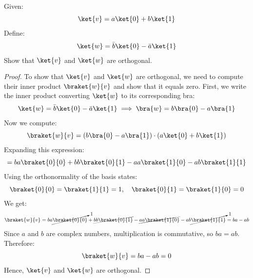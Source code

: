 \begin{examplebox}
    Given:
    \begin{equation*}
        \ket{v} = a \ket{0} + b \ket{1}
    \end{equation*}
    Define:
    \begin{equation*}
        \ket{w} = \bar{b} \ket{0} - \bar{a} \ket{1}
    \end{equation*}
    Show that $\ket{v}$ and $\ket{w}$ are orthogonal.

    \begin{proof}
        To show that $\ket{v}$ and $\ket{w}$ are orthogonal, we need to compute their inner product $\braket{w}{v}$ and show that it equals zero. First, we write the inner product converting $\ket{w}$ to its corresponding bra:
        \begin{equation*}
            \ket{w} = \bar{b} \ket{0} - \bar{a} \ket{1} \implies \bra{w} = b \bra{0} - a \bra{1}
        \end{equation*}
        Now we compute:
        \begin{equation*}
            \braket{w}{v}
            =
            \left(b \bra{0} - a \bra{1}\right) \cdot \left(a \ket{0} + b \ket{1}\right)
        \end{equation*}
        Expanding this expression:
        \begin{equation*}
            = b a \braket{0}{0}
            + b b \braket{0}{1}
            - a a \braket{1}{0}
            - a b \braket{1}{1}
        \end{equation*}
        Using the orthonormality of the basis states:
        \begin{equation*}
            \braket{0}{0} = \braket{1}{1} = 1,
            \quad
            \braket{0}{1} = \braket{1}{0} = 0
        \end{equation*}
        We get:
        \begin{equation*}
            \braket{w}{v} = b a \cancelto{1}{\braket{0}{0}}
            + \cancel{b b \braket{0}{1}}
            - \cancel{a a \braket{1}{0}}
            - a b \cancelto{1}{\braket{1}{1}}
            =
            b a - a b
        \end{equation*}
        Since $a$ and $b$ are complex numbers, multiplication is commutative, so $ba = ab$. Therefore:
        \begin{equation*}
            \braket{w}{v} = ba - ab = 0
        \end{equation*}
        Hence, $\ket{v}$ and $\ket{w}$ are orthogonal.
    \end{proof}
\end{examplebox}